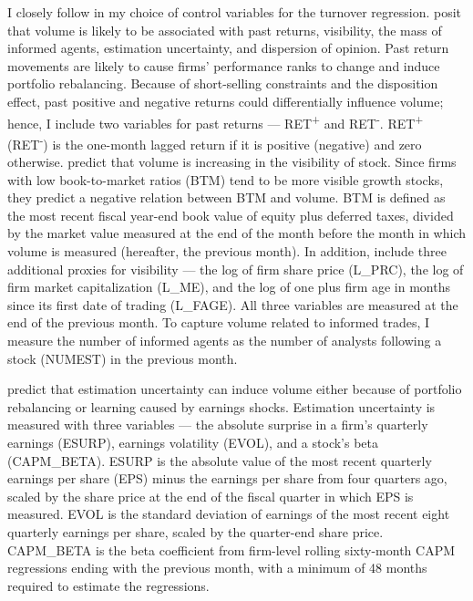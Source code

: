 \documentclass[
  12pt,
  a4paper,
  twoside,
  onecolumn]{article}
\begin{document}
I closely follow  in my choice of control
variables for the turnover regression. 
posit that volume is likely to be associated with past returns,
visibility, the mass of informed agents, estimation uncertainty, and
dispersion of opinion. Past return movements are likely to cause firms'
performance ranks to change and induce portfolio rebalancing. Because of
short-selling constraints and the disposition effect, past positive and
negative returns could differentially influence volume; hence, I include
two variables for past returns --- RET\textsuperscript{+} and
RET\textsuperscript{-}. RET\textsuperscript{+} (RET\textsuperscript{-})
is the one-month lagged return if it is positive (negative) and zero
otherwise.  predict that volume is
increasing in the visibility of stock. Since firms with low
book-to-market ratios (BTM) tend to be more visible growth stocks, they
predict a negative relation between BTM and volume. BTM is defined as
the most recent fiscal year-end book value of equity plus deferred
taxes, divided by the market value measured at the end of the month
before the month in which volume is measured (hereafter, the previous
month). In addition,  include three
additional proxies for visibility --- the log of firm share price
(L\_PRC), the log of firm market capitalization (L\_ME), and the log of
one plus firm age in months since its first date of trading (L\_FAGE).
All three variables are measured at the end of the previous month. To
capture volume related to informed trades, I measure the number of
informed agents as the number of analysts following a stock (NUMEST) in
the previous month.

 predict that estimation uncertainty can
induce volume either because of portfolio rebalancing or learning caused
by earnings shocks. Estimation uncertainty is measured with three
variables --- the absolute surprise in a firm's quarterly earnings
(ESURP), earnings volatility (EVOL), and a stock's beta (CAPM\_BETA).
ESURP is the absolute value of the most recent quarterly earnings per
share (EPS) minus the earnings per share from four quarters ago, scaled
by the share price at the end of the fiscal quarter in which EPS is
measured. EVOL is the standard deviation of earnings of the most recent
eight quarterly earnings per share, scaled by the quarter-end share
price. CAPM\_BETA is the beta coefficient from firm-level rolling
sixty-month CAPM regressions ending with the previous month, with a
minimum of 48 months required to estimate the regressions.
\end{document}
